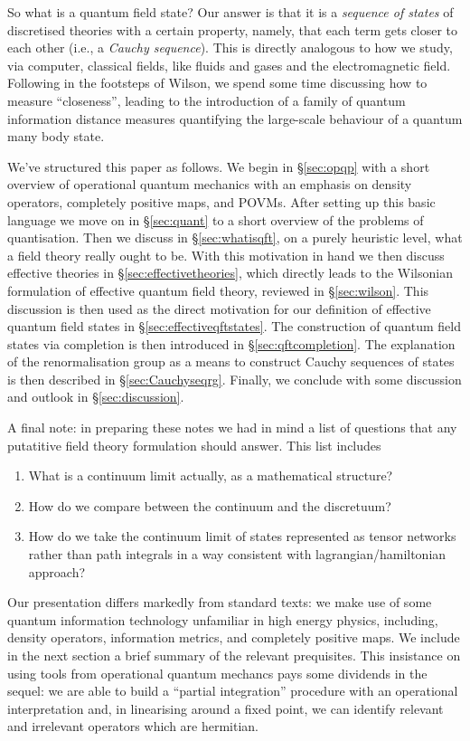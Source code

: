 \documentclass[11pt]{amsart}
\theoremstyle{plain}%
\theoremstyle{definition}
\theoremstyle{remark}
\begin{document}
So what is a quantum field state? Our answer is that it is a \emph{sequence of states} of discretised theories with a certain property, namely, that each term gets closer to each other (i.e., a \emph{Cauchy sequence}). This is directly analogous to how we study, via computer, classical fields, like fluids and gases and the electromagnetic field. Following in the footsteps of Wilson, we spend some time discussing how to measure ``closeness'', leading to the introduction of a family of quantum information distance measures quantifying the large-scale behaviour of a quantum many body state. 

We've structured this paper as follows. We begin in \S\ref{sec:opqp} with a short overview of operational quantum mechanics with an emphasis on density operators, completely positive maps, and POVMs. After setting up this basic language we move on in \S\ref{sec:quant} to a short overview of the problems of quantisation. Then we discuss in \S\ref{sec:whatisqft}, on a purely heuristic level, what a field theory really ought to be. With this motivation in hand we then discuss effective theories in \S\ref{sec:effectivetheories}, which directly leads to the Wilsonian formulation of effective quantum field theory, reviewed in \S\ref{sec:wilson}. This discussion is then used as the direct motivation for our definition of effective quantum field states in \S\ref{sec:effectiveqftstates}. The construction of quantum field states via completion is then introduced in \S\ref{sec:qftcompletion}. The explanation of the renormalisation group as a means to construct Cauchy sequences of states is then described in \S\ref{sec:Cauchyseqrg}. Finally, we conclude with some discussion and outlook in \S\ref{sec:discussion}.

A final note: in preparing these notes we had in mind a list of questions that any putatitive field theory formulation should answer. This list includes
\begin{enumerate}
	\item What is a continuum limit actually, as a mathematical structure?
	\item How do we compare between the continuum and the discretuum?
	\item How do we take the continuum limit of states represented as tensor networks rather than path integrals in a way consistent with lagrangian/hamiltonian approach?
\end{enumerate}
Our presentation differs markedly from standard texts: we make use of some quantum information technology unfamiliar in high energy physics, including, density operators, information metrics, and completely positive maps. We include in the next section a brief summary of the relevant prequisites. This insistance on using tools from operational quantum mechancs pays some dividends in the sequel: we are able to build a ``partial integration'' procedure with an operational interpretation and, in linearising around a fixed point, we can identify relevant and irrelevant operators which are hermitian.
\end{document}
